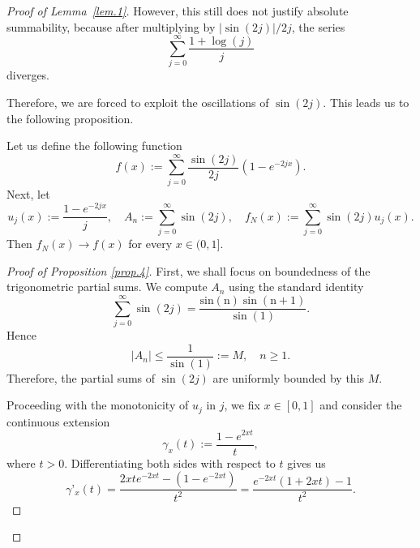 \documentclass[preprint,12pt,nopreprintline]{elsarticle}
\begin{document}
\begin{proof}[Proof of Lemma~\ref{lem.1}]
However, this still does not justify absolute summability, because after multiplying by \(\vert\operatorname{sin}\left(2j\right)\vert/2j\), the series 
\begin{equation}
\sum_{j=0}^{\infty}\frac{1+\operatorname{log}\left(j\right)}{j}
\end{equation}
diverges.

Therefore, we are forced to exploit the oscillations of \(\operatorname{sin}\left(2j\right)\). This leads us to the following proposition.
\begin{prop}\label{prop.4}
Let us define the following function
\begin{equation}
f\left(x\right):=\sum_{j=0}^{\infty}\frac{\operatorname{sin}\left(2j\right)}{2j}\left(1-e^{-2jx}\right).
\end{equation}
Next, let 
\begin{equation}
u_j\left(x\right):=\frac{1-e^{-2jx}}{j},\quad A_n:=\sum_{j=0}^{\infty}\operatorname{sin}\left(2j\right),\quad f_N\left(x\right):=\sum_{j=0}^{\infty}\operatorname{sin}\left(2j\right)u_j\left(x\right).
\end{equation}
Then \(f_N\left(x\right)\longrightarrow f\left(x\right)\) for every \(x\in(0,1]\).
\end{prop}

\vspace{0.1cm}
\begin{proof}[Proof of Proposition \ref{prop.4}]\normalfont
First, we shall focus on boundedness of the trigonometric partial sums. We compute \(A_n\) using the standard identity
\begin{equation}
\sum_{j=0}^{\infty}\operatorname{sin}\left(2j\right)=\frac{\operatorname{sin\left(n\right)\operatorname{sin}\left(n+1\right)}}{\operatorname{sin}\left(1\right)}.
\end{equation}
Hence 
\begin{equation}\label{eq.185}
\vert A_n\vert\leq\frac{1}{\operatorname{sin}\left(1\right)}:=M,\quad n\geq 1.
\end{equation}
Therefore, the partial sums of \(\operatorname{sin}\left(2j\right)\) are uniformly bounded by this \(M\).

Proceeding with the monotonicity of \(u_j\) in \(j\), we fix \(x\in[0,1]\) and consider the continuous extension
\begin{equation}
\gamma_x\left(t\right):=\frac{1-e^{2xt}}{t},
\end{equation}
where \(t>0\). Differentiating both sides with respect to \(t\) gives us
\begin{equation}
\gamma’_x\left(t\right)=\frac{2xte^{-2xt}-\left(1-e^{-2xt}\right)}{t^2}=\frac{e^{-2xt}\left(1+2xt\right)-1}{t^2}.
\end{equation}


\end{proof}
\end{proof}
\end{document}
